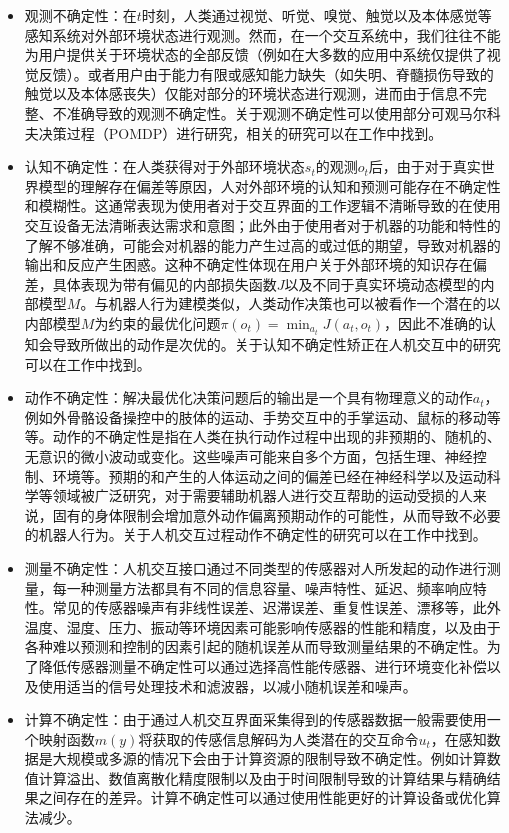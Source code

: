\begin{itemize}
\item 观测不确定性：在$t$时刻，人类通过视觉、听觉、嗅觉、触觉以及本体感觉等感知系统对外部环境状态进行观测。然而，在一个交互系统中，我们往往不能为用户提供关于环境状态的全部反馈（例如在大多数的应用中系统仅提供了视觉反馈）。或者用户由于能力有限或感知能力缺失（如失明、脊髓损伤导致的触觉以及本体感丧失）仅能对部分的环境状态进行观测，进而由于信息不完整、不准确导致的观测不确定性。关于观测不确定性可以使用部分可观马尔科夫决策过程（POMDP）进行研究，相关的研究可以在工作\cite{torretresolsPOMDPbasedControlHybrid2022,youngPOMDPbasedStatisticalSpoken2012,zhengPOMDPModelLearning2018a}中找到。
\item 认知不确定性：在人类获得对于外部环境状态$s_t$的观测$o_t$后，由于对于真实世界模型的理解存在偏差等原因，人对外部环境的认知和预测可能存在不确定性和模糊性。这通常表现为使用者对于交互界面的工作逻辑不清晰导致的在使用交互设备无法清晰表达需求和意图；此外由于使用者对于机器的功能和特性的了解不够准确，可能会对机器的能力产生过高的或过低的期望，导致对机器的输出和反应产生困惑。这种不确定性体现在用户关于外部环境的知识存在偏差，具体表现为带有偏见的内部损失函数$J$以及不同于真实环境动态模型的内部模型$M$。与机器人行为建模类似，人类动作决策也可以被看作一个潜在的以内部模型$M$为约束的最优化问题$\pi(o_t)=\min_{a_t} J(a_t,o_t)$，因此不准确的认知会导致所做出的动作是次优的。关于认知不确定性矫正在人机交互中的研究可以在工作\cite{gongWhatItYou2020,golubLearningInternalDynamics,raffertyInferringLearnersKnowledge,reddyWhereYouThink2018,javdaniSharedAutonomyHindsight2018}中找到。
\item 动作不确定性：解决最优化决策问题后的输出是一个具有物理意义的动作$a_t$，例如外骨骼设备操控中的肢体的运动、手势交互中的手掌运动、鼠标的移动等等。动作的不确定性是指在人类在执行动作过程中出现的非预期的、随机的、无意识的微小波动或变化。这些噪声可能来自多个方面，包括生理、神经控制、环境等。预期的和产生的人体运动之间的偏差已经在神经科学以及运动科学等领域被广泛研究\cite{vanbeersRoleExecutionNoise2004,faisalNoiseNervousSystem2008,churchlandCentralSourceMovement2006}，对于需要辅助机器人进行交互帮助的运动受损的人来说，固有的身体限制会增加意外动作偏离预期动作的可能性，从而导致不必要的机器人行为。关于人机交互过程动作不确定性的研究可以在工作\cite{gopinathCustomizedHandlingUnintended2021,jainProbabilisticHumanIntent2020}中找到。
\item 测量不确定性：人机交互接口通过不同类型的传感器对人所发起的动作进行测量，每一种测量方法都具有不同的信息容量、噪声特性、延迟、频率响应特性。常见的传感器噪声有非线性误差、迟滞误差、重复性误差、漂移等，此外温度、湿度、压力、振动等环境因素可能影响传感器的性能和精度，以及由于各种难以预测和控制的因素引起的随机误差从而导致测量结果的不确定性。为了降低传感器测量不确定性可以通过选择高性能传感器、进行环境变化补偿以及使用适当的信号处理技术和滤波器，以减小随机误差和噪声。
\item 计算不确定性：由于通过人机交互界面采集得到的传感器数据一般需要使用一个映射函数$m(y)$将获取的传感信息解码为人类潜在的交互命令$u_t$，在感知数据是大规模或多源的情况下会由于计算资源的限制导致不确定性。例如计算数值计算溢出、数值离散化精度限制以及由于时间限制导致的计算结果与精确结果之间存在的差异。计算不确定性可以通过使用性能更好的计算设备或优化算法减少。
\end{itemize}

